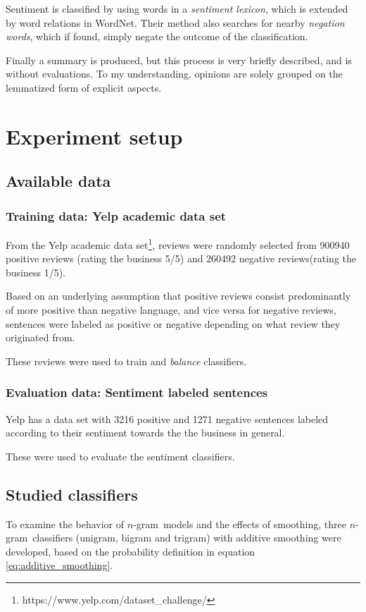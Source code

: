 \documentclass[a4paper,11pt]{kth-mag}
\newcommand{\ngram}{$n$-gram}
\begin{document}
Sentiment is classified by using words in a \emph{sentiment lexicon},
which is extended by word relations in WordNet. Their method also searches for nearby
\emph{negation words}, which if found,
simply negate the outcome of the classification.

Finally a summary is produced, but this process is very briefly described, and is without evaluations. To my understanding, opinions are solely grouped on the lemmatized form of explicit aspects.


\pagebreak
\section{Experiment setup}

\subsection{Available data}

\subsubsection{Training data: Yelp academic data set}
From the Yelp academic data set\footnote{https://www.yelp.com/dataset\_challenge/},
reviews were randomly selected from 900940 positive reviews (rating the business 5/5)
and 260492 negative reviews(rating the business 1/5).%

Based on an underlying assumption that positive reviews consist predominantly of more
positive than negative language, and vice versa for negative reviews,
sentences were labeled as positive or negative depending on what review they originated from.

These reviews were used to train and \emph{balance} classifiers.

\subsubsection{Evaluation data: Sentiment labeled sentences}
Yelp has a data set with 3216 positive and 1271 negative sentences labeled
according to their sentiment towards the the business in general.

These were used to evaluate the sentiment classifiers.

\subsection{Studied classifiers}
To examine the behavior of \ngram~models and the effects of smoothing,
three \ngram~classifiers (unigram, bigram and trigram) with additive smoothing
were developed, based on the probability definition in equation \ref{eq:additive_smoothing}.
\end{document}
